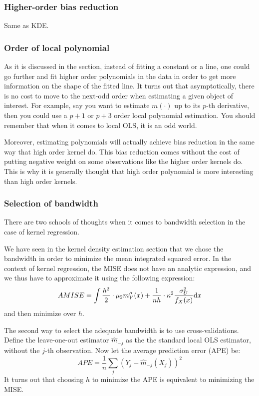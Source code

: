 \subsubsection{Higher-order bias reduction}

Same as KDE.

\subsubsection{Order of local polynomial}

As it is discussed in the section, instead of fitting a constant or a line, one could go further and fit higher order polynomials in the data in order to get more information on the shape of the fitted line. It turns out that asymptotically, there is no cost to move to the next-odd order when estimating a given object of interest. For example, say you want to estimate $m(\cdot)$ up to its $p$-th derivative, then you could use a $p+1$ or $p+3$ order local polynomial estimation. You should remember that when it comes to local OLS, it is an odd world.

Moreover, estimating polynomials will actually achieve bias reduction in the same way that high order kernel do. This bias reduction comes without the cost of putting negative weight on some observations like the higher order kernels do. This is why it is generally thought that high order polynomial is more interesting than high order kernels.

\subsubsection{Selection of bandwidth}

There are two schools of thoughts when it comes to bandwidth selection in the case of kernel regression.

We have seen in the kernel density estimation section that we chose the bandwidth in order to minimize the mean integrated squared error. In the context of kernel regression, the MISE does not have an analytic expression, and we thus have to approximate it using the following expression: $$ AMISE = \int \frac{h^2}{2} \cdot \mu_2 m_Y''(x) + \frac{1}{nh}\cdot\kappa^2\frac{\sigma_U^2}{f_X(x)} \mathrm{d} x $$ and then minimize over $h$.

The second way to select the adequate bandwidth is to use cross-validations. Define the leave-one-out estimator $\hat m_{-j}$ as the the standard local OLS estimator, without the $j$-th observation. Now let the average prediction error (APE) be: $$APE = \frac{1}{n} \sum_j (Y_j - \hat m_{-j}(X_j))^2 $$ It turns out that choosing $h$ to minimize the APE is equivalent to minimizing the MISE.

